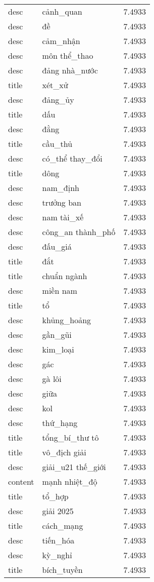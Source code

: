 \documentclass{article}
\begin{document}
\begin{tabular}{lll}
desc & cảnh\_quan & 7.4933\\
desc & đề & 7.4933\\
desc & cảm\_nhận & 7.4933\\
desc & môn thể\_thao & 7.4933\\
desc & đảng nhà\_nước & 7.4933\\
title & xét\_xử & 7.4933\\
desc & đảng\_ủy & 7.4933\\
title & dấu & 7.4933\\
desc & đằng & 7.4933\\
title & cầu\_thủ & 7.4933\\
desc & có\_thể thay\_đổi & 7.4933\\
title & dông & 7.4933\\
desc & nam\_định & 7.4933\\
desc & trưởng ban & 7.4933\\
desc & nam tài\_xế & 7.4933\\
desc & công\_an thành\_phố & 7.4933\\
desc & đấu\_giá & 7.4933\\
title & đắt & 7.4933\\
title & chuẩn ngành & 7.4933\\
desc & miền nam & 7.4933\\
title & tổ & 7.4933\\
desc & khủng\_hoảng & 7.4933\\
desc & gần\_gũi & 7.4933\\
desc & kim\_loại & 7.4933\\
desc & gác & 7.4933\\
desc & gà lôi & 7.4933\\
desc & giữa & 7.4933\\
desc & kol & 7.4933\\
desc & thứ\_hạng & 7.4933\\
title & tổng\_bí\_thư tô & 7.4933\\
title & vô\_địch giải & 7.4933\\
desc & giải\_u21 thế\_giới & 7.4933\\
content & mạnh nhiệt\_độ & 7.4933\\
title & tổ\_hợp & 7.4933\\
desc & giải 2025 & 7.4933\\
title & cách\_mạng & 7.4933\\
desc & tiến\_hóa & 7.4933\\
desc & kỳ\_nghỉ & 7.4933\\
title & bích\_tuyền & 7.4933\\

\end{tabular}
\end{document}
